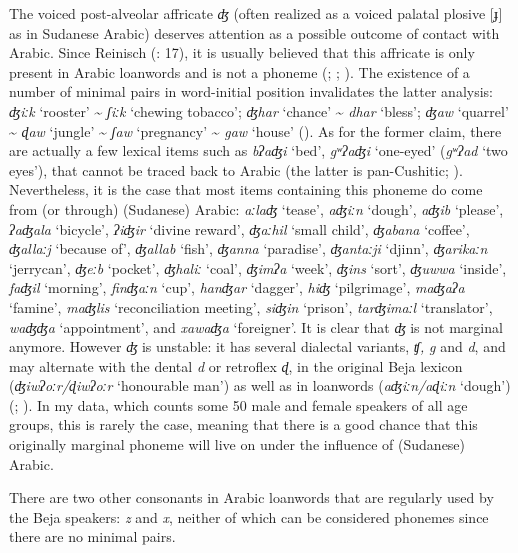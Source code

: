 \documentclass[output=paper]{langsci/langscibook}
\begin{document}
The voiced post-alveolar affricate \textit{ʤ} (often realized as a voiced palatal plosive [ɟ] as in Sudanese Arabic) deserves attention as a possible outcome of contact with Arabic. Since Reinisch (\citeyear{Reinisch1893}: 17), it is usually believed that this affricate is only present in Arabic loanwords and is not a phoneme (\citealt{Roper1928}; \citealt{Hudson1976}; \citealt{Morin1995}). The existence of a number of minimal pairs in word-initial position invalidates the latter analysis: \textit{ʤiːk} ‘rooster’ {\textasciitilde} \textit{ʃiːk} ‘chewing tobacco’; \textit{ʤhar} ‘chance’ {\textasciitilde} \textit{dhar} ‘bless’; \textit{ʤaw} ‘quarrel’ {\textasciitilde} \textit{ɖaw} ‘jungle’ {\textasciitilde} \textit{ʃaw} ‘pregnancy’ {\textasciitilde} \textit{gaw} ‘house’ (\citealt{Vanhove2017}). As for the former claim, there are actually a few lexical items such as \textit{bʔaʤi} ‘bed’, \textit{gʷʔaʤi} ‘one-eyed’ (\textit{gʷʔad} ‘two eyes’), that cannot be traced back to Arabic (the latter is pan-Cushitic; \citealt{Blažek2000}). Nevertheless, it is the case that most items containing this phoneme do come from (or through) (Sudanese) Arabic: \textit{aːlaʤ} ‘tease’, \textit{aʤiːn} ‘dough’, \textit{aʤib} ‘please’, \textit{ʔaʤala} ‘bicycle’, \textit{ʔiʤir} ‘divine reward’, \textit{ʤaːhil} ‘small child’, \textit{ʤabana} ‘coffee’, \textit{ʤallaːj} ‘because of’, \textit{ʤallab} ‘fish’, \textit{ʤanna} ‘paradise’, \textit{ʤantaːji} ‘djinn’, \textit{ʤarikaːn} ‘jerrycan’, \textit{ʤeːb} ‘pocket’, \textit{ʤhaliː} ‘coal’, \textit{ʤimʔa} ‘week’, \textit{ʤins} ‘sort’, \textit{ʤuwwa} ‘inside’, \textit{faʤil} ‘morning’, \textit{finʤaːn} ‘cup’, \textit{hanʤar} ‘dagger’, \textit{hiʤ} ‘pilgrimage’, \textit{maʤaʔa} ‘famine’, \textit{maʤlis} ‘reconciliation meeting’, \textit{siʤin} ‘prison’, \textit{tarʤimaːl} ‘translator’, \textit{waʤʤa} ‘appointment’, and \textit{xawaʤa} ‘foreigner’. It is clear that \textit{ʤ} is not marginal anymore. However \textit{ʤ} is unstable: it has several dialectal variants, \textit{ʧ,} \textit{g} and \textit{d}, and may alternate with the dental \textit{d} or retroflex \textit{ɖ}, in the original Beja lexicon (\textit{ʤiwʔoːr/ɖiwʔoːr} ‘honourable man’) as well as in loanwords (\textit{aʤiːn/aɖiːn} ‘dough’) (\citealt{VanhoveHamidAhmed2011}; \citealt{Vanhove2017}). In my data, which counts some 50 male and female speakers of all age groups, this is rarely the case, meaning that there is a good chance that this originally marginal phoneme will live on under the influence of (Sudanese) Arabic.

There are two other consonants in Arabic loanwords that are regularly used by the Beja speakers: \textit{z} and \textit{x}, neither of which can be considered phonemes since there are no minimal pairs.
\end{document}
